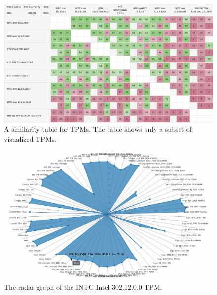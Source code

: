 \begin{landscape}
    \begin{figure}[!t]
        \includegraphics[width=\linewidth, height=\textwidth]{img/visualizations/tpm-similarity.png}
        \caption{A similarity table for TPMs. The table shows only a subset of visualized TPMs.}
    \end{figure}
\end{landscape}

\begin{landscape}
\begin{figure}[!t]
    \centering
    \includegraphics[width=\linewidth]{img/visualizations/INTC_Intel_302.12.0.0 radar graph.png}
    \caption{
    The radar graph of the INTC Intel 302.12.0.0 TPM.
    }
\end{figure}
\end{landscape}

